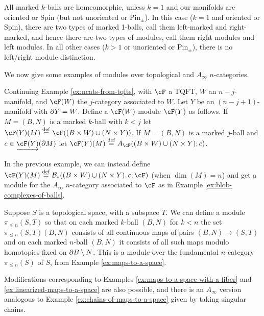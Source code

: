 All marked $k$-balls are homeomorphic, unless $k = 1$ and our manifolds
are oriented or Spin (but not unoriented or $\text{Pin}_\pm$).
In this case ($k=1$ and oriented or Spin), there are two types
of marked 1-balls, call them left-marked and right-marked,
and hence there are two types of modules, call them right modules and left modules.
In all other cases ($k>1$ or unoriented or $\text{Pin}_\pm$),
there is no left/right module distinction.

\medskip

We now give some examples of modules over topological and $A_\infty$ $n$-categories.

\begin{example}
\rm
Continuing Example \ref{ex:ncats-from-tqfts}, with $\cF$ a TQFT, $W$ an $n{-}j$-manifold,
and $\cF(W)$ the $j$-category associated to $W$.
Let $Y$ be an $(n{-}j{+}1)$-manifold with $\partial Y = W$.
Define a $\cF(W)$ module $\cF(Y)$ as follows.
If $M = (B, N)$ is a marked $k$-ball with $k<j$ let 
$\cF(Y)(M)\deq \cF((B\times W) \cup (N\times Y))$.
If $M = (B, N)$ is a marked $j$-ball and $c\in \cl{\cF(Y)}(\bd M)$ let
$\cF(Y)(M)\deq A_\cF((B\times W) \cup (N\times Y); c)$.
\end{example}

\begin{example} \label{bc-module-example}
\rm
In the previous example, we can instead define
$\cF(Y)(M)\deq \bc_*((B\times W) \cup (N\times Y), c; \cF)$ (when $\dim(M) = n$)
and get a module for the $A_\infty$ $n$-category associated to $\cF$ as in 
Example \ref{ex:blob-complexes-of-balls}.
\end{example}


\begin{example}
\rm
Suppose $S$ is a topological space, with a subspace $T$.
We can define a module $\pi_{\leq n}(S,T)$ so that on each marked $k$-ball $(B,N)$ 
for $k<n$ the set $\pi_{\leq n}(S,T)(B,N)$ consists of all continuous maps of pairs 
$(B,N) \to (S,T)$ and on each marked $n$-ball $(B,N)$ it consists of all 
such maps modulo homotopies fixed on $\partial B \setminus N$.
This is a module over the fundamental $n$-category $\pi_{\leq n}(S)$ of $S$, from Example \ref{ex:maps-to-a-space}.
\end{example}
Modifications corresponding to Examples \ref{ex:maps-to-a-space-with-a-fiber} and 
\ref{ex:linearized-maps-to-a-space} are also possible, and there is an $A_\infty$ version analogous to 
Example \ref{ex:chains-of-maps-to-a-space} given by taking singular chains.





